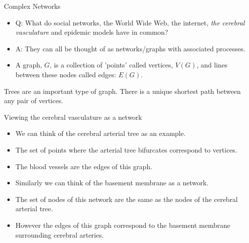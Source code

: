 \documentclass{beamer}
\begin{document}
\begin{frame}{Complex Networks}
\begin{itemize}
 \item[]Q: What do social networks, the World Wide Web, the internet, \emph{the cerebral vasculature} and epidemic models have in common?
 \item[]A: They can all be thought of as networks/graphs with associated processes.
 \item[]A graph, $G$, is a collection of 'points' called vertices, $V(G)$, and lines between these nodes called edges: $E(G)$.   
\end{itemize}
\begin{figure}[scale = 0.5]
\end{figure}

Trees are an important type of graph.  There is a unique shortest path between any pair of vertices.  

\end{frame}
\begin{frame}{Viewing the cerebral vasculature as a network}

\begin{itemize}
 \item[]We can think of the cerebral arterial tree as an example.
 \item[]The set of points where the arterial tree bifurcates correspond to vertices.
 \item[]The blood vessels are the edges of this graph.
\end{itemize}
\begin{itemize}
 \item[]Similarly we can think of the basement membrane as a network.
 \item[]The set of nodes of this network are the same as the nodes of the cerebral arterial tree.
 \item[]However the edges of this graph correspond to the basement membrane surrounding cerebral arteries.  
\end{itemize}
\end{frame}
\end{document}
